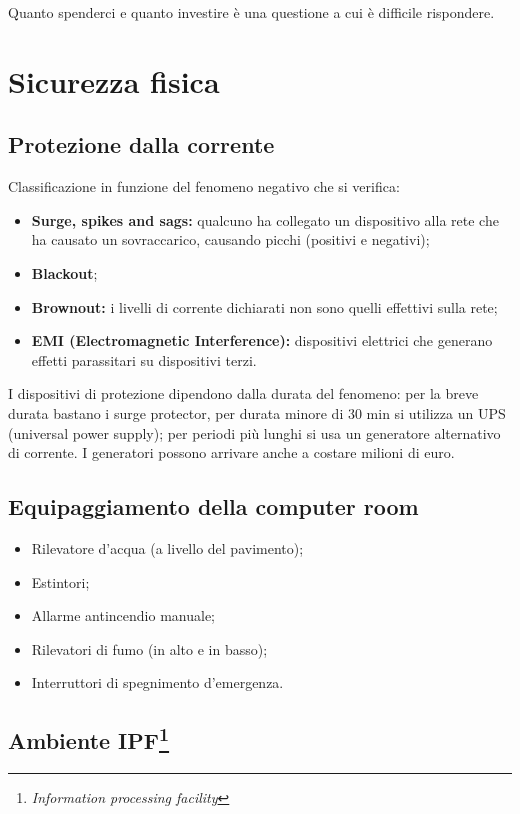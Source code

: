 Quanto spenderci e quanto investire è una questione a cui è difficile
rispondere.

\section{Sicurezza fisica}
\label{SFDP:fisica}
\subsection{Protezione dalla corrente}

Classificazione in funzione del fenomeno negativo che si verifica:
\begin{itemize}
\item \textbf{Surge, spikes and sags:} qualcuno ha collegato un dispositivo alla rete che
ha causato un sovraccarico, causando picchi (positivi e negativi);
\item \textbf{Blackout};
\item \textbf{Brownout:} i livelli di corrente dichiarati non sono quelli effettivi sulla
rete;
\item \textbf{EMI (Electromagnetic Interference):} dispositivi elettrici che generano
effetti parassitari su dispositivi terzi.
\end{itemize}

I dispositivi di protezione dipendono dalla durata del fenomeno: per la breve
durata bastano i surge protector, per durata minore di 30 min si utilizza un UPS
(universal power supply); per periodi più lunghi si usa un generatore
alternativo di corrente. I generatori possono arrivare anche a costare milioni
di euro.

\subsection{Equipaggiamento della computer room}

\begin{itemize}
\item Rilevatore d'acqua (a livello del pavimento);
\item Estintori;
\item Allarme antincendio manuale;
\item Rilevatori di fumo (in alto e in basso);
\item Interruttori di spegnimento d'emergenza.
\end{itemize}

\subsection[Ambiente IPF]{Ambiente IPF\protect\footnote{\textit{Information
processing facility}}}


